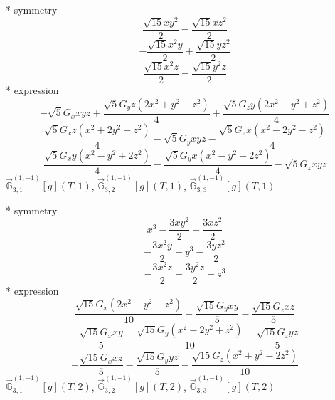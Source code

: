 \documentclass[fleqn,8pt]{jsarticle}
\begin{document}
\noindent\quad ** symmetry
\begin{dmath*}
\frac{\sqrt{15} x y^{2}}{2} - \frac{\sqrt{15} x z^{2}}{2}
\end{dmath*}
\begin{dmath*}
- \frac{\sqrt{15} x^{2} y}{2} + \frac{\sqrt{15} y z^{2}}{2}
\end{dmath*}
\begin{dmath*}
\frac{\sqrt{15} x^{2} z}{2} - \frac{\sqrt{15} y^{2} z}{2}
\end{dmath*}
\noindent\quad ** expression
\begin{dmath*}
- \sqrt{5} G_{x} x y z + \frac{\sqrt{5} G_{y} z \left(2 x^{2} + y^{2} - z^{2}\right)}{4} + \frac{\sqrt{5} G_{z} y \left(2 x^{2} - y^{2} + z^{2}\right)}{4}
\end{dmath*}
\begin{dmath*}
\frac{\sqrt{5} G_{x} z \left(x^{2} + 2 y^{2} - z^{2}\right)}{4} - \sqrt{5} G_{y} x y z - \frac{\sqrt{5} G_{z} x \left(x^{2} - 2 y^{2} - z^{2}\right)}{4}
\end{dmath*}
\begin{dmath*}
\frac{\sqrt{5} G_{x} y \left(x^{2} - y^{2} + 2 z^{2}\right)}{4} - \frac{\sqrt{5} G_{y} x \left(x^{2} - y^{2} - 2 z^{2}\right)}{4} - \sqrt{5} G_{z} x y z
\end{dmath*}
\noindent\quad $\vec{\mathbb{G}}_{3,1}^{(1,-1)}[g](T,1)$, $\vec{\mathbb{G}}_{3,2}^{(1,-1)}[g](T,1)$, $\vec{\mathbb{G}}_{3,3}^{(1,-1)}[g](T,1)$

\noindent\quad ** symmetry
\begin{dmath*}
x^{3} - \frac{3 x y^{2}}{2} - \frac{3 x z^{2}}{2}
\end{dmath*}
\begin{dmath*}
- \frac{3 x^{2} y}{2} + y^{3} - \frac{3 y z^{2}}{2}
\end{dmath*}
\begin{dmath*}
- \frac{3 x^{2} z}{2} - \frac{3 y^{2} z}{2} + z^{3}
\end{dmath*}
\noindent\quad ** expression
\begin{dmath*}
\frac{\sqrt{15} G_{x} \left(2 x^{2} - y^{2} - z^{2}\right)}{10} - \frac{\sqrt{15} G_{y} x y}{5} - \frac{\sqrt{15} G_{z} x z}{5}
\end{dmath*}
\begin{dmath*}
- \frac{\sqrt{15} G_{x} x y}{5} - \frac{\sqrt{15} G_{y} \left(x^{2} - 2 y^{2} + z^{2}\right)}{10} - \frac{\sqrt{15} G_{z} y z}{5}
\end{dmath*}
\begin{dmath*}
- \frac{\sqrt{15} G_{x} x z}{5} - \frac{\sqrt{15} G_{y} y z}{5} - \frac{\sqrt{15} G_{z} \left(x^{2} + y^{2} - 2 z^{2}\right)}{10}
\end{dmath*}
\noindent\quad $\vec{\mathbb{G}}_{3,1}^{(1,-1)}[g](T,2)$, $\vec{\mathbb{G}}_{3,2}^{(1,-1)}[g](T,2)$, $\vec{\mathbb{G}}_{3,3}^{(1,-1)}[g](T,2)$
\end{document}
